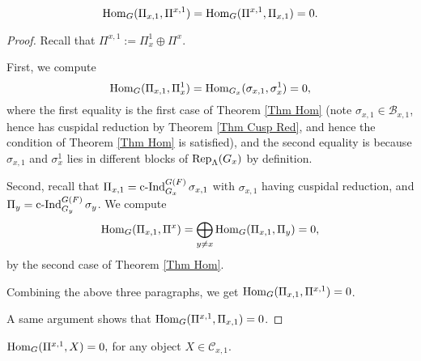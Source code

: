 	

	
	\begin{lemma}\label{Lem Ortho}
		$$\operatorname{\operatorname{Hom}}_G(\Pi_{x,1}, \Pi^{x,1})=\operatorname{\operatorname{Hom}}_G(\Pi^{x,1}, \Pi_{x,1})=0.$$
	\end{lemma}
	
	\begin{proof}
		Recall that
		$\Pi^{x,1}:=\Pi_x^1 \oplus \Pi^x$.
		
		First, we compute
		$$\operatorname{\operatorname{Hom}}_G(\Pi_{x,1}, \Pi_x^1)=\operatorname{\operatorname{Hom}}_{G_x}(\sigma_{x,1}, \sigma_x^1)=0,$$
		where the first equality is the first case of Theorem \ref{Thm Hom} (note $\sigma_{x,1} \in \mathcal{B}_{x,1}$, hence has cuspidal reduction by Theorem \ref{Thm Cusp Red}, and hence the condition of Theorem \ref{Thm Hom} is satisfied), and the second equality is because $\sigma_{x,1}$ and $\sigma_x^1$ lies in different blocks of $\operatorname{\operatorname{Rep}}_{\Lambda}(G_x)$ by definition.
		
		Second, recall that $\Pi_{x,1}=\operatorname{\operatorname{c-Ind}}_{G_x}^{G(F)}\sigma_{x,1}$ with $\sigma_{x,1}$ having cuspidal reduction, and $\Pi_y=\operatorname{\operatorname{c-Ind}}_{G_y}^{G(F)}\sigma_y$. We compute 
		$$\operatorname{\operatorname{Hom}}_G(\Pi_{x,1}, \Pi^x)=\bigoplus_{y \neq x}\operatorname{\operatorname{Hom}}_G(\Pi_{x,1}, \Pi_y)=0,$$
		by the second case of Theorem \ref{Thm Hom}.
		
		Combining the above three paragraphs, we get $\operatorname{\operatorname{Hom}}_G(\Pi_{x,1}, \Pi^{x,1})=0$.
		
		A same argument shows that $\operatorname{\operatorname{Hom}}_G(\Pi^{x,1}, \Pi_{x,1})=0$.
	\end{proof}
	
	\begin{lemma}\label{Lem Gen}
		$\operatorname{\operatorname{Hom}}_G(\Pi^{x,1}, X)=0,$
		for any object $X \in \mathcal{C}_{x,1}$.
	\end{lemma}
	
